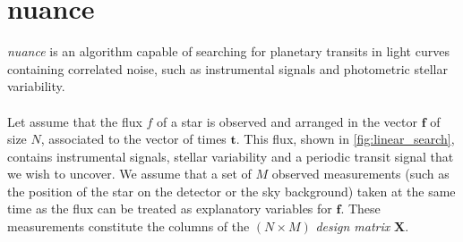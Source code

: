\documentclass{aastex631}
\begin{document}
\newpage
\section{\textsf{nuance}}\label{nuance}

\textit{nuance} is an algorithm capable of searching for planetary transits in light curves containing correlated noise, such as instrumental signals and photometric stellar variability.
\\\\
Let assume that the flux $f$ of a star is observed and arranged in the vector $\bm{f}$ of size $N$, associated to the vector of times $\bm{t}$. This flux, shown in \autoref{fig:linear_search}, contains instrumental signals, stellar variability and a periodic transit signal that we wish to uncover. We assume that a set of $M$ observed measurements (such as the position of the star on the detector or the sky background) taken at the same time as the flux can be treated as explanatory variables for $\bm{f}$. These measurements constitute the columns of the $(N\times M)$ \textit{design matrix} $\bm{X}$.\\\\
\end{document}
